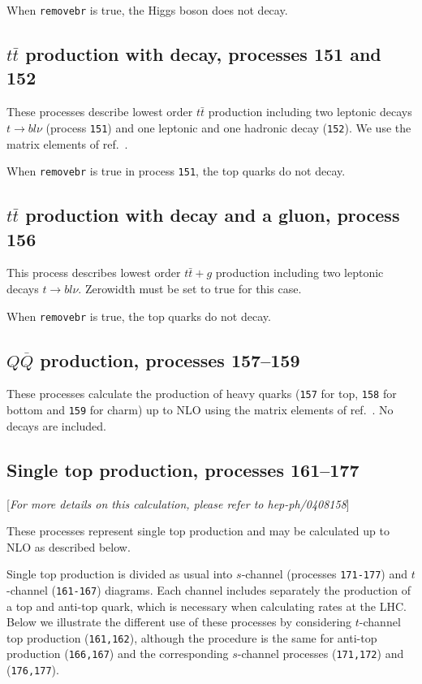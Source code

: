 \documentclass[12pt]{article}
\begin{document}
When {\tt removebr} is true, the Higgs boson does not decay.

\subsection{$t\bar{t}$ production with decay, processes 151 and 152}

These processes describe lowest order $t \bar{t}$ production 
including two leptonic decays $t \to b l \nu$ (process {\tt 151}) and 
one leptonic and one hadronic decay ({\tt 152}).
We use the matrix elements of ref.~\cite{Kleiss:1988xr}.


When {\tt removebr} is true in process {\tt 151},
the top quarks do not decay.

\subsection{$t\bar{t}$ production with decay and a gluon, process 156}
This process describes lowest order $t \bar{t}+g$ production 
including two leptonic decays $t \to b l \nu$. Zerowidth must be set to true for 
this case.

When {\tt removebr} is true, the top quarks do not decay.

\subsection{$Q\overline{Q}$ production, processes 157--159}
These processes calculate the production of heavy quarks
({\tt 157} for top, {\tt 158} for bottom and {\tt 159} for charm) up to NLO 
using the matrix elements of ref.~\cite{Nason:1987xz}. No decays
are included.

\subsection{Single top production, processes 161--177}
\label{subsec:stop}

\begin{center}
[{\it For more details on this calculation, please refer to hep-ph/0408158}]
\end{center}

These processes represent single top production and may be calculated up to
NLO as described below.

Single top production is divided as usual into $s$-channel 
(processes {\tt 171-177}) and $t$-channel ({\tt 161-167})
diagrams. Each channel includes separately the production of a top
and anti-top quark, which is necessary when calculating rates at the LHC.
Below we illustrate the different use of these processes by considering
$t$-channel top production ({\tt 161,162}), although the procedure is the same
for anti-top production ({\tt 166,167}) and the corresponding $s$-channel
processes ({\tt 171,172}) and ({\tt 176,177}).
\end{document}
